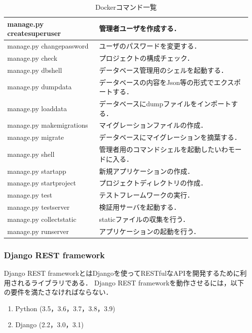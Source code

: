 \begin{table}[htb]
    \begin{center}
        \caption{Dockerコマンド一覧}
        \begin{tabularx}{\textwidth}{|l|X|}\hline
            manage.py createsuperuser & 管理者ユーザを作成する． \\ \hline
            manage.py changepassword & ユーザのパスワードを変更する． \\ \hline
            manage.py check & プロジェクトの構成チェック． \\ \hline
            manage.py dbshell & データベース管理用のシェルを起動する． \\ \hline
            manage.py dumpdata & データベースの内容をJson等の形式でエクスポートする． \\ \hline
            manage.py loaddata & データベースにdumpファイルをインポートする． \\ \hline
            manage.py makemigrations & マイグレーションファイルの作成． \\ \hline
            manage.py migrate & データベースにマイグレーションを摘葉する． \\ \hline
            manage.py shell & 管理者用のコマンドシェルを起動したいわモードに入る． \\ \hline
            manage.py startapp & 新規アプリケーションの作成． \\ \hline
            manage.py startproject & プロジェクトディレクトリの作成． \\ \hline
            manage.py test & テストフレームワークの実行． \\ \hline
            manage.py testserver & 検証用サーバを起動する． \\ \hline
            manage.py collectstatic & staticファイルの収集を行う． \\ \hline
            manage.py runserver & アプリケーションの起動を行う． \\ \hline
        \end{tabularx}
        \label{django_command}
    \end{center}
\end{table}

\subsubsection{Django REST framework}
Django REST framework\cite{drf}とはDjangoを使ってRESTfulなAPIを開発するために利用されるライブラリである．
Django REST frameworkを動作させるには，以下の要件を満たさなければならない．
\begin{enumerate}
    \item Python (3.5，3.6，3.7，3.8，3.9)
    \item Django (2.2，3.0，3.1)
\end{enumerate}


